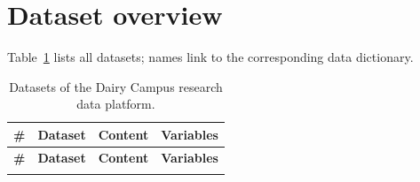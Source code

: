 \documentclass[10pt,a4paper]{article}
\begin{document}
\section{Dataset overview}\label{sec:overview}
Table~\ref{tab:overview} lists all datasets; names link to the corresponding data dictionary.
\begingroup\small
{}
\begin{longtable}{>{\raggedleft\arraybackslash}p{}
                  >{\raggedright\arraybackslash}p{}
                  >{\raggedright\arraybackslash}p{}
                  >{\raggedleft\arraybackslash}p{}}
\caption{Datasets of the Dairy Campus research data platform.}\label{tab:overview}\\
\toprule
\sffamily\bfseries \# & \sffamily\bfseries Dataset & \sffamily\bfseries Content & \sffamily\bfseries Variables\\
\midrule\endfirsthead
\toprule
\sffamily\bfseries \# & \sffamily\bfseries Dataset & \sffamily\bfseries Content & \sffamily\bfseries Variables\\
\midrule\endhead
\bottomrule\endfoot


\end{longtable}
\end{document}
